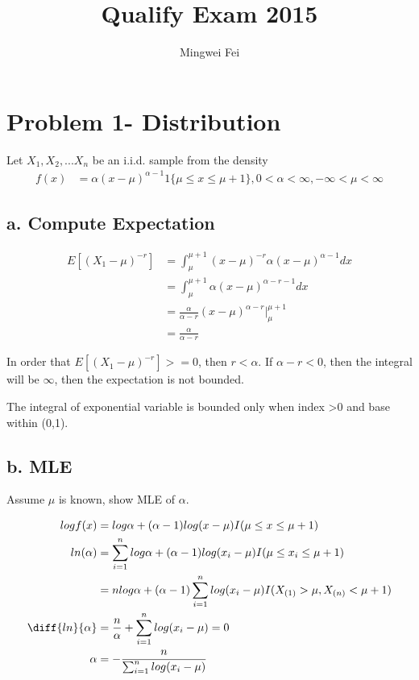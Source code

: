 \documentclass[11pt]{article} %
\title{Qualify Exam 2015}
\author{Mingwei Fei}
\begin{document}
	
	\maketitle
	
\section{Problem 1- Distribution}
	Let $X_1, X_2,... X_n$ be an i.i.d. sample from the density
	\begin{align*}
		f(x) &= \alpha(x-\mu)^{\alpha-1} 1\{ \mu \leq x \leq \mu+1\}, 0< \alpha < \infty, -\infty < \mu < \infty
	\end{align*}	
	
\subsection{a. Compute Expectation}

	\begin{align*}
		E[(X_1- \mu)^{-r}] &= \int_{\mu}^{\mu+1} (x-\mu)^{-r} \alpha (x-\mu)^{\alpha-1} dx \\
		&= \int_{\mu}^{\mu+1} \alpha (x-\mu)^{\alpha-r-1} dx \\
		&= \frac{\alpha}{\alpha -r} (x-\mu)^{\alpha-r} \Bigg |_{\mu}^{\mu+1}\\
		&=  \frac{\alpha}{\alpha -r} 
	\end{align*}	

In order that $E[(X_1- \mu)^{-r}] >= 0$, then $r < \alpha$. If $\alpha -r < 0$, then the integral will be $
\infty$, then the expectation is not bounded.

The integral of exponential variable is bounded only when index >0 and base within (0,1).

\subsection{b. MLE}
Assume $\mu$ is known, show MLE of $\alpha$.

	\begin{align*}
		log f(x)&= log \alpha + (\alpha -1) log(x-\mu) I(\mu \leq x \leq \mu+1)\\
		ln(\alpha) &= \sum_{i=1}^n log \alpha + (\alpha -1) log(x_i-\mu) I(\mu \leq x_i \leq \mu+1) \\
		&= n log \alpha +  (\alpha -1) \sum_{i=1}^n log (x_i - \mu) I(X_{(1)} > \mu, X_{(n)} < \mu+1)\\
		\diff{ln}{\alpha}&= \frac{n}{\alpha } +\sum_{i=1}^n log (x_i - \mu) =0 \\
		\alpha &= - \frac{n}{\sum_{i=1}^n log (x_i - \mu)} 
	\end{align*}
	
\end{document}
